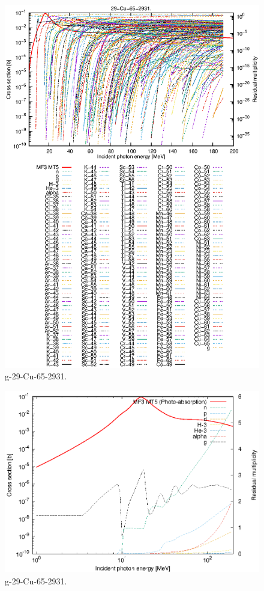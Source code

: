 \begin{figure}
 \includegraphics[width=\linewidth]{eps/g_29-Cu-65_2931.eps}
  \caption{g-29-Cu-65-2931.}
\end{figure}
\newpage \clearpage

\begin{figure}
 \includegraphics[width=\linewidth]{eps-log/g_29-Cu-65_2931.eps}
 \caption{g-29-Cu-65-2931.}
\end{figure}
\newpage \clearpage

